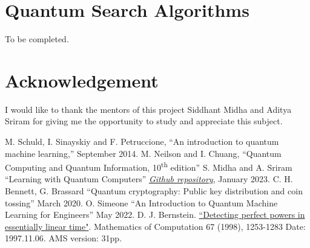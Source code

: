 \documentclass[conference]{IEEEtran}
\begin{document}
\section{Quantum Search Algorithms}

To be completed.

\section*{Acknowledgement}
I would like to thank the mentors of this project Siddhant Midha and Aditya Sriram for giving 
me the opportunity to study and appreciate this subject. 

\begin{thebibliography}{00}
 M. Schuld, I. Sinayskiy and F. Petruccione, ``An introduction to quantum machine learning,'' September 2014.
 M. Neilson and I. Chuang, ``Quantum Computing and Quantum Information, 10\textsuperscript{th} edition''
 S. Midha and A. Sriram ``Learning with Quantum Computers'' \href{https://github.com/siddhant-midha/WiDS-22-Learning-with-quantum-computers-}{\textit{Github repository}}, January 2023.
 C. H. Bennett, G. Brassard ``Quantum cryptography: Public key distribution and coin tossing'' March 2020.
 O. Simeone ``An Introduction to Quantum Machine Learning for Engineers'' May 2022.
 D. J. Bernstein. \href{http://cr.yp.to/papers/powers-19971106-retypeset20220326.pdf}{``Detecting perfect powers in essentially linear time"}. Mathematics of Computation 67 (1998), 1253-1283 Date: 1997.11.06. AMS version: 31pp.
\end{thebibliography}
\vspace{12pt}
\end{document}
